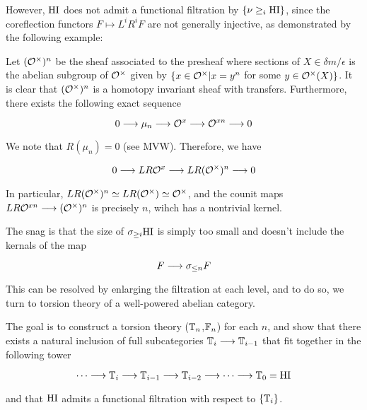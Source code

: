 However, $\mathrm{HI}$ does not admit a functional filtration by $\{\nu 
\geq_{i} \mathrm{HI}\}$, since the coreflection functors $F \mapsto 
L^iR^iF$ are not generally injective, as demonstrated by the 
following example: 

\begin{ex}
Let $(\mathcal{O}^{\times})^n$ be the sheaf associated to the presheaf where 
sections of $X \in \delta m /\epsilon$ is the abelian subgroup of 
$\mathcal{O}^{\times}$ given by $\{x \in \mathcal{O}^{\times} | x=y^n$ for some $y \in \mathcal{O}^{\times}(X)\}$. 
It is clear that $(\mathcal{O}^{\times})^n$ is a homotopy invariant sheaf with 
transfers. Furthermore, there exists the following exact sequence 

\begin{equation}
0 \longrightarrow \mu_n \longrightarrow \mathcal{O}^x \longrightarrow \mathcal{O}^{xn} 
\longrightarrow 0
\end{equation}

We note that $R(\mu_n) = 0$ (see MVW). Therefore, we have

\begin{equation}
0 \longrightarrow LR\mathcal{O}^x \longrightarrow LR(\mathcal{O}^{\times})^{n} \longrightarrow 0
\end{equation}

In particular, $LR(\mathcal{O}^{\times})^{n} \simeq LR(\mathcal{O}^{\times}) \simeq \mathcal{O}^{\times}$, and the counit 
maps $LR\mathcal{O}^{xn} \longrightarrow (\mathcal{O}^{\times})^n$ is precisely $n$, wihch has 
a nontrivial kernel.

The snag is that the size of $\sigma_{\geq i} \mathrm{HI}$ is simply too small 
and doesn't include the kernals of the map

\begin{equation}
F \longrightarrow \sigma_{\leq n} F
\end{equation}

This can be resolved by enlarging the filtration at each level, 
and to do so, we turn to torsion theory of a well-powered abelian 
category.  
\end{ex}

The goal is to construct a torsion theory ($\mathbb{T}_n$,$\mathbb{F}_n$) 
for each $n$, and show that there exists a natural inclusion of 
full subcategories $\mathbb{T}_i \longrightarrow \mathbb{T}_{i-1}$ that fit 
together in the following tower

\begin{equation}
\cdots \longrightarrow \mathbb{T}_i \longrightarrow \mathbb{T}_{i-1} 
\longrightarrow \mathbb{T}_{i-2} \longrightarrow \cdots 
\longrightarrow \mathbb{T}_0 = \mathrm{HI}
\end{equation}

and that $\mathrm{HI}$ admits a functional filtration with respect to 
$\{\mathbb{T}_i\}$.

